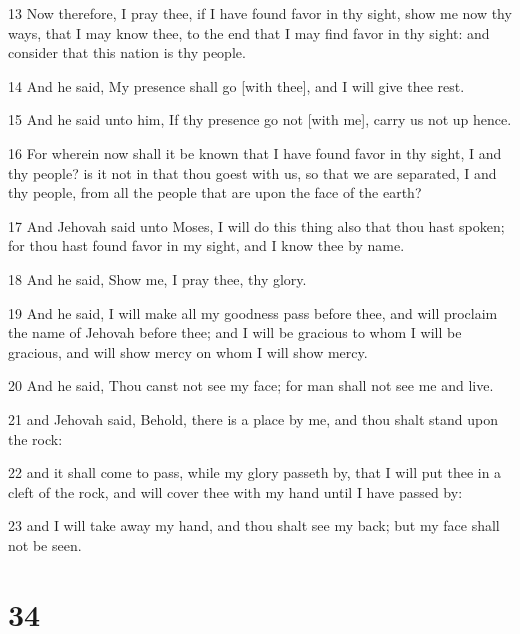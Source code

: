 \par 13 Now therefore, I pray thee, if I have found favor in thy sight, show me now thy ways, that I may know thee, to the end that I may find favor in thy sight: and consider that this nation is thy people.
\par 14 And he said, My presence shall go [with thee], and I will give thee rest.
\par 15 And he said unto him, If thy presence go not [with me], carry us not up hence.
\par 16 For wherein now shall it be known that I have found favor in thy sight, I and thy people? is it not in that thou goest with us, so that we are separated, I and thy people, from all the people that are upon the face of the earth?
\par 17 And Jehovah said unto Moses, I will do this thing also that thou hast spoken; for thou hast found favor in my sight, and I know thee by name.
\par 18 And he said, Show me, I pray thee, thy glory.
\par 19 And he said, I will make all my goodness pass before thee, and will proclaim the name of Jehovah before thee; and I will be gracious to whom I will be gracious, and will show mercy on whom I will show mercy.
\par 20 And he said, Thou canst not see my face; for man shall not see me and live.
\par 21 and Jehovah said, Behold, there is a place by me, and thou shalt stand upon the rock:
\par 22 and it shall come to pass, while my glory passeth by, that I will put thee in a cleft of the rock, and will cover thee with my hand until I have passed by:
\par 23 and I will take away my hand, and thou shalt see my back; but my face shall not be seen.

\chapter{34}

